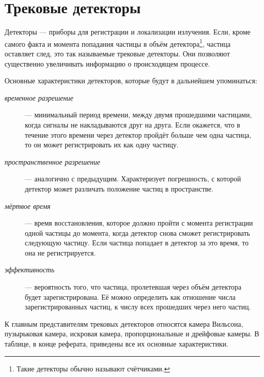 
\section{Трековые детекторы}
Детекторы --- приборы для регистрации и локализации излучения. Если,
кроме самого факта и момента попадания частицы в объём
детектора\footnote{Такие детекторы обычно называют счётчиками.}, частица
оставляет след, это так называемые трековые детекторы. Они позволяют
существенно увеличивать информацию о происходящем процессе.

Основные характеристики детекторов, которые будут в дальнейшем
упоминаться:
\begin{description}
\item[\it временное разрешение]--- минимальный период времени, между
  двумя прошедшими частицами, когда сигналы не накладываются друг на
  друга. Если окажется, что в течение этого времени через детектор пройдёт
  больше чем одна частица, то он может регистрировать их как одну
  частицу.
\item[\it пространственное разрешение]--- аналогично с предыдущим.
  Характеризует погрешность, с которой детектор может различать положение
  частиц в пространстве.
\item[\it мёртвое время]--- время восстановления, которое должно пройти
  с момента регистрации одной частицы до момента, когда детектор снова
  сможет регистрировать следующую частицу. Если частица попадает
  в детектор за это время, то она не регистрируется.
\item[\it эффективность]--- вероятность того, что частица, пролетевшая
  через объём детектора будет зарегистрирована. Её можно определить как
  отношение числа зарегистрированных частиц, к числу всех прошедших
  через него частиц.
\end{description}
К главным представителям трековых детекторов относятся камера Вильсона,
пузырьковая камера, искровая камера, пропорциональные и дрейфовые
камеры. В таблице, в конце реферата, приведены все их основные
характеристики.

